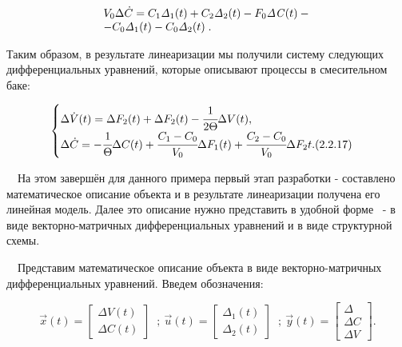 \bigskip

\begin{equation*}
\begin{matrix}V_0\Delta \dot C=C_1\mathit{\Delta  }_1(t)+C_2\mathit{\Delta  }_2(t)-F_0\mathit{\Delta C}(t)-\hfill\null
\\-C_0\mathit{\Delta  }_1(t)-C_0\mathit{\Delta  }_2(t)\;.\hfill\null \end{matrix}\hfill 
\end{equation*}

		Таким образом, в результате линеаризации мы получили систему следующих дифференциальных уравнений, которые описывают
		процессы в смесительном баке:


\begin{equation}
\begin{cases}\label{eq:smethitelbak}
	\Delta \dot{V}(t)=\Delta F_{2}(t)+\Delta F_{2}(t)-\cfrac{1}{2\Theta}\Delta V(t),\\
	\Delta \dot{C}=-\cfrac{1}{\Theta}\Delta C(t)+\cfrac{C_{1}-C_{0}}{V_{0}}\Delta F_{1}(t)+\cfrac{C_{2}-C_{0}}{V_{0}}\Delta F_{2}t.
	 (2.2.17)
\end{cases}
\end{equation}


		\ \ На этом завершён для данного примера первый этап разработки - составлено математическое описание объекта и в
		результате линеаризации получена его линейная модель. Далее это описание нужно представить в удобной форме \ - в виде
		векторно-матричных дифференциальных уравнений и в виде структурной схемы.



		\ \ Представим математическое описание объекта в виде векторно-матричных дифференциальных уравнений. Введем обозначения:



\begin{equation*}
		\vec x(t)=\left[\begin{matrix}\mathit{\Delta V}(t)\\\mathit{\Delta C}(t)\end{matrix}\right]\;\;; \  \vec
		u(t)=\left[\begin{matrix}\mathit{\Delta  }_1(t)\\\mathit{\Delta  }_2(t)\end{matrix}\right]\;\;; \  \vec
		y(t)=\left[\begin{matrix}\mathit{\Delta  }\\\mathit{\Delta C}\\\mathit{\Delta V}\end{matrix}\right].
\end{equation*}


